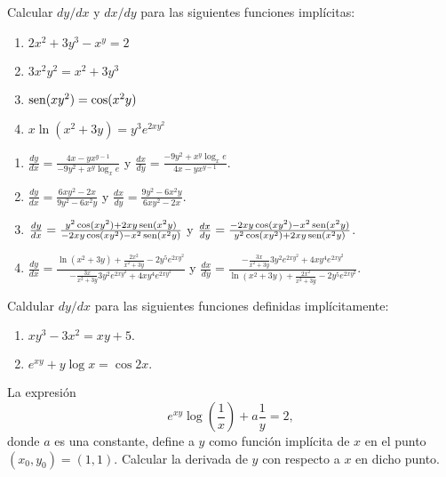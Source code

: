 {Calcular $dy/dx$ y $dx/dy$ para las siguientes funciones implícitas:
\begin{enumerate}
\item $2x^2+3y^3-x^y= 2$
\item $3x^2y^2 = x^2 + 3y^3$
\item $\operatorname{sen} (xy^2) = \cos(x^2y)$
\item $x \ln (x^2+3y)  = y^3e^{2xy^2}$
\end{enumerate}
}
{\begin{enumerate}
\item $\frac{dy}{dx} = \frac{4x-yx^{y-1}}{-9y^2+x^y\log_x e}$ y $\frac{dx}{dy} = \frac{-9y^2+x^y\log_x e}{4x-yx^{y-1}}$.
\item $\frac{dy}{dx} = \frac{6xy^2-2x}{9y^2-6x^2y}$ y $\frac{dx}{dy} = \frac{9y^2-6x^2y}{6xy^2-2x}$.
\item $\frac{dy}{dx} = \frac{y^2\cos(xy^2)+2xy\operatorname{sen}(x^2y)}{-2xy\cos(xy^2)-x^2\operatorname{sen}(x^2y)}$ y $\frac{dx}{dy} = \frac{-2xy\cos(xy^2)-x^2\operatorname{sen}(x^2y)}{y^2\cos(xy^2)+2xy\operatorname{sen}(x^2y)}$.
\item $\frac{dy}{dx} = \frac{\ln(x^2+3y)+\frac{2x^2}{x^2+3y}-2y^5e^{2xy^2}}{-\frac{3x}{x^2+3y}3y^2e^{2xy^2}+4xy^4e^{2xy^2}}$ y $\frac{dx}{dy} = \frac{-\frac{3x}{x^2+3y}3y^2e^{2xy^2}+4xy^4e^{2xy^2}}{\ln(x^2+3y)+\frac{2x^2}{x^2+3y}-2y^5e^{2xy^2}}$.
\end{enumerate}
}
{
}


{Caldular $dy/dx$ para las siguientes funciones definidas implícitamente:
\begin{enumerate}
\item  $xy^{3}-3x^{2}=xy+5.$
\item  $e^{xy}+y\log x=\cos 2x.$
\end{enumerate}
}


{La expresión
\[
e^{xy}\log \left( \dfrac{1}{x}\right) +a\dfrac{1}{y}=2,
\]
donde $a$ es una constante, define a $y$ como función implícita de $x $ en el punto $\left( x_{0},y_{0}\right) =\left( 1,1\right) .$
Calcular la derivada de $y$ con respecto a $x$ en dicho punto.
}

